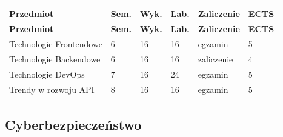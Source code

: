 \documentclass[12pt,a4paper]{article}
\newcommand{\thdrule}{\noalign{\global\setlength{\extrarowheight}{0pt}}}
\newcommand{\thdend}{\noalign{\global\setlength{\extrarowheight}{4pt}}}
\begin{document}
{\scriptsize
\begin{longtable}{m{6.5cm}m{0.7cm}m{1cm}m{1cm}m{1.7cm}m{0.7cm}}
\thdrule\toprule
\rowcolor{pjatkRed}
{\color{white}\footnotesize\textbf{\vphantom{Ag}Przedmiot}} & {\color{white}\footnotesize\textbf{\vphantom{Ag}Sem.}} & {\color{white}\footnotesize\textbf{\vphantom{Ag}Wyk.}} & {\color{white}\footnotesize\textbf{\vphantom{Ag}Lab.}} & {\color{white}\footnotesize\textbf{\vphantom{Ag}Zaliczenie}} & {\color{white}\footnotesize\textbf{\vphantom{Ag}ECTS}} \\
\midrule\thdend
\endfirsthead
\thdrule\toprule
\rowcolor{pjatkRed}
{\color{white}\footnotesize\textbf{\vphantom{Ag}Przedmiot}} & {\color{white}\footnotesize\textbf{\vphantom{Ag}Sem.}} & {\color{white}\footnotesize\textbf{\vphantom{Ag}Wyk.}} & {\color{white}\footnotesize\textbf{\vphantom{Ag}Lab.}} & {\color{white}\footnotesize\textbf{\vphantom{Ag}Zaliczenie}} & {\color{white}\footnotesize\textbf{\vphantom{Ag}ECTS}} \\
\midrule\thdend
\endhead
\rowcolor{tableRowLight} Technologie Frontendowe & 6 & 16 & 16 & {\scriptsize egzamin} & 5 \\
\rowcolor{tableRowAlt} Technologie Backendowe & 6 & 16 & 16 & {\scriptsize zaliczenie} & 4 \\
\rowcolor{tableRowLight} Technologie DevOps & 7 & 16 & 24 & {\scriptsize egzamin} & 5 \\
\rowcolor{tableRowAlt} Trendy w rozwoju API & 8 & 16 & 16 & {\scriptsize egzamin} & 5 \\
\bottomrule
\end{longtable}}

\subsection*{Cyberbezpieczeństwo}
\end{document}
